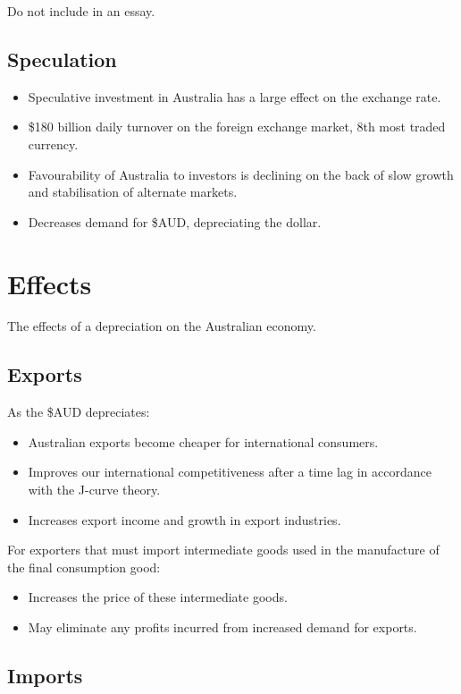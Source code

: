 \documentclass[a4paper,11pt]{report}
\begin{document}
Do not include in an essay.

\subsection{Speculation}

\begin{itemize}
\item Speculative investment in Australia has a large effect on the exchange
	rate.
\item \$180 billion daily turnover on the foreign exchange market, 8th most
	traded currency.
\item Favourability of Australia to investors is declining on the back of slow
	growth and stabilisation of alternate markets.
\item Decreases demand for \$AUD, depreciating the dollar.
\end{itemize}


\section{Effects}

The effects of a depreciation on the Australian economy.

\subsection{Exports}

As the \$AUD depreciates:

\begin{itemize}
\item Australian exports become cheaper for international consumers.
\item Improves our international competitiveness after a time lag in accordance
	with the J-curve theory.
\item Increases export income and growth in export industries.
\end{itemize}

For exporters that must import intermediate goods used in the manufacture of
the final consumption good:

\begin{itemize}
\item Increases the price of these intermediate goods.
\item May eliminate any profits incurred from increased demand for exports.
\end{itemize}

\subsection{Imports}
\end{document}
